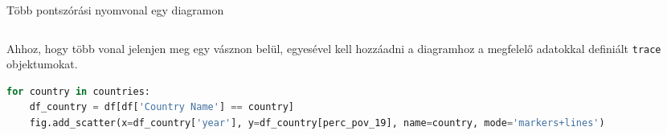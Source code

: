 \documentclass[english, aspectratio=169]{beamer}
\begin{document}
\begin{frame}[fragile]{Több pontszórási nyomvonal egy diagramon}
	\begin{columns}
		\begin{column}{.5\textwidth}
			Ahhoz, hogy több vonal jelenjen meg egy vásznon belül, egyesével kell hozzáadni a diagramhoz a megfelelő adatokkal definiált \texttt{trace} objektumokat.
			\begin{lstlisting}[language=python]
for country in countries:
	df_country = df[df['Country Name'] == country]
	fig.add_scatter(x=df_country['year'], y=df_country[perc_pov_19], name=country, mode='markers+lines')
			\end{lstlisting}
		\end{column}
		\begin{column}{.5\textwidth}
			
		\end{column}
	\end{columns}
\end{frame}
\end{document}
